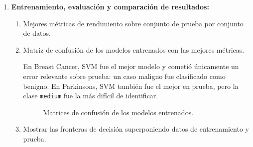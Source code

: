 \documentclass{article}
\begin{document}
\begin{enumerate}
  \item \textbf{Entrenamiento, evaluación y comparación de resultados:}
    \begin{enumerate}
      \item Mejores métricas de rendimiento sobre conjunto de prueba por conjunto de datos.

      \begin{table}[h!]
      \centering
      \caption{Comparación de rendimiento en el conjunto de prueba.}
      \end{table}

      \item Matriz de confusión de los modelos entrenados con las mejores métricas.

      En Breast Cancer, SVM fue el mejor modelo y cometió únicamente un error relevante sobre prueba: un caso maligno fue clasificado como benigno. En Parkinsons, SVM también fue el mejor en prueba, pero la clase \texttt{medium} fue la más difícil de identificar.

      \begin{figure}[h!]
      \centering
      \caption{Matrices de confusión de los modelos entrenados.}
      \label{fig:confusion}
      \end{figure}

      \item Mostrar las fronteras de decisión superponiendo datos de entrenamiento y prueba.


\end{enumerate}
\end{enumerate}
\end{document}

